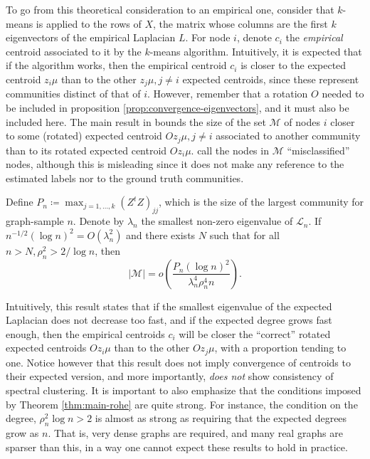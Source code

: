 \documentclass[../../main.tex]{subfiles} %
\begin{document}
	To go from this theoretical consideration to an empirical one, consider that 
	\(k\)-means is applied to the rows of \(X\), the matrix whose columns are 
	the first \(k\) eigenvectors of the empirical Laplacian \(L\). For node \(i\), 
	denote \(c_i\) the \textit{empirical} centroid associated to it by the 
	\(k\)-means algorithm. Intuitively, it is expected that if the algorithm works, 
	then the empirical centroid \(c_i\) is closer to the expected centroid \(z_i 
	\mu\) than to the other \(z_j \mu, j \neq i\) expected centroids, since 
	these represent communities distinct of that of \(i\). However, remember 
	that a rotation \(O\) needed to be included in proposition 
	\ref{prop:convergence-eigenvectors}, and it must also be included here.  The 
	main result in 
	\cite{rohe_spectral_2011} bounds the size of the set \(\mathscr M\) of nodes 
	\(i\) closer to some (rotated) expected centroid \(O z_j \mu, j \neq i\) 
	associated to another community than to its rotated expected centroid \(O 
	z_i \mu\). \cite{rohe_spectral_2011} call the nodes in \(\mathscr M\) 
	``misclassified'' nodes, although this is misleading since it does not make 
	any reference to the estimated labels nor to the ground truth communities.
	\begin{theorem}
		Define \(P_n \coloneqq \max_{j = 1, \dots, k} (Z^t Z)_{jj}\), which is the 
		size of the largest community for graph-sample \(n\). Denote by 
		\(\lambda_n\) the smallest non-zero eigenvalue of \(\mathscr L_n\). If 
		\(n^{-1/2}(\log n)^2 = O(\lambda_n^2)\) and there exists \(N\) such that 
		for all \(n > N, \rho_n^2 > 2/\log n\), then
		\begin{equation}
			\vert \mathscr M \vert = o \left(\frac{P_n (\log n)^2}{\lambda_n^4 
			\rho_n^4 n}\right).
		\end{equation}
	\label{thm:main-rohe}
	\end{theorem}
	
	Intuitively, this result states that if the smallest eigenvalue of the expected 
	Laplacian does not decrease too fast, and if the expected degree grows fast 
	enough, then the empirical centroids \(c_i\) will be closer the ``correct'' 
	rotated expected centroids \(O z_i \mu\) than to the other \(O z_j \mu\), 
	with a proportion tending to one. Notice however that this result does not 
	imply convergence of centroids to their expected version, and more 
	importantly, \textit{does not} show consistency of spectral clustering. It is 
	important to also emphasize that the conditions imposed by Theorem 
	\ref{thm:main-rohe} are quite strong. For instance, the condition on the 
	degree, \(\rho_n^2 \log n > 2\) is almost as strong as requiring that the 
	expected degrees grow as \(n\). That is, very dense graphs are required, and 
	many real graphs are sparser than this, in a way one cannot expect these 
	results to hold in practice.
	
\end{document}
